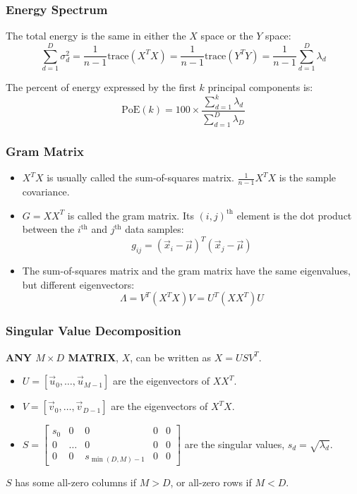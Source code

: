 \documentclass{beamer}
\begin{document}
\begin{frame}
  \frametitle{Energy Spectrum}

  The total energy is the same in either the $X$ space or the $Y$ space:
  \begin{displaymath}
    \sum_{d=1}^D \sigma_d^2 = \frac{1}{n-1}\mbox{trace}\left(X^TX\right)
    = \frac{1}{n-1}\mbox{trace}\left(Y^TY\right)
    =\frac{1}{n-1}\sum_{d=1}^D \lambda_d
  \end{displaymath}

  The percent of energy expressed by the first $k$ principal components is:
  \begin{displaymath}
    \mbox{PoE}(k) = 100\times \frac{\sum_{d=1}^k\lambda_d}{\sum_{d=1}^D\lambda_D}
  \end{displaymath}
\end{frame}

\begin{frame}
  \frametitle{Gram Matrix}
  \begin{itemize}
  \item $X^TX$ is usually called the sum-of-squares matrix.
    $\frac{1}{n-1}X^TX$ is the sample covariance.
  \item $G=XX^T$ is called the gram matrix.
    Its $(i,j)^{\textrm{th}}$ element is the dot product between
    the $i^{\textrm{th}}$ and $j^{\textrm{th}}$ data samples:
    \[
    g_{ij}=(\vec{x}_i-\vec\mu)^T(\vec{x}_j-\vec\mu)
    \]
  \item The sum-of-squares matrix and the gram matrix have the same
    eigenvalues, but different eigenvectors:
    \[
    \Lambda = V^T (X^TX) V = U^T (XX^T) U
    \]
  \end{itemize}
\end{frame}

\begin{frame}
  \frametitle{Singular Value Decomposition}
  {\bf ANY $M\times D$ MATRIX}, $X$, can be written as $X=USV^T$.
  \begin{itemize}
  \item $U=[\vec{u}_0,\ldots,\vec{u}_{M-1}]$ are the eigenvectors of $XX^T$.
  \item $V=[\vec{v}_0,\ldots,\vec{v}_{D-1}]$ are the eigenvectors of $X^TX$.
  \item
    $S=\left[\begin{array}{ccccc}s_0&0&0&0&0\\0&\ldots&0&0&0\\0&0&s_{\min(D,M)-1}&0&0\end{array}\right]$
    are the singular values, $s_d=\sqrt{\lambda_d}$.
  \end{itemize}
  $S$ has some all-zero columns if $M>D$, or all-zero rows if $M<D$.
\end{frame}
\end{document}
